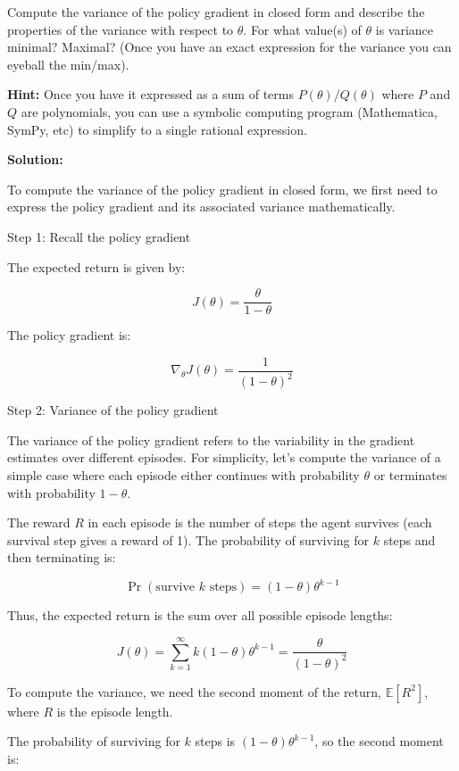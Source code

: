 \documentclass{article}
\begin{document}
\begin{enumerate}
\begin{enumerate}
\end{enumerate}
\newpage
{} Compute the variance of the policy gradient in closed form and describe the properties of the variance with respect to $\theta$. For what value(s) of $\theta$ is variance minimal? Maximal? (Once you have an exact expression for the variance you can eyeball the min/max).

\textbf{Hint:}  Once you have it expressed as a sum of terms $P(\theta)/Q(\theta)$ where $P$ and $Q$ are polynomials, you can use a symbolic computing program (Mathematica, SymPy, etc) to simplify to a single rational expression.

\textbf{Solution:}

To compute the variance of the policy gradient in closed form, we first need to express the policy gradient and its associated variance mathematically.

Step 1: Recall the policy gradient

The expected return is given by:

\[
J(\theta) = \frac{\theta}{1 - \theta}
\]

The policy gradient is:

\[
\nabla_\theta J(\theta) = \frac{1}{(1 - \theta)^2}
\]

Step 2: Variance of the policy gradient

The variance of the policy gradient refers to the variability in the gradient estimates over different episodes. For simplicity, let’s compute the variance of a simple case where each episode either continues with probability \( \theta \) or terminates with probability \( 1 - \theta \).

The reward \( R \) in each episode is the number of steps the agent survives (each survival step gives a reward of 1). The probability of surviving for \( k \) steps and then terminating is:

\[
\Pr(\text{survive } k \text{ steps}) = (1 - \theta)\theta^{k-1}
\]

Thus, the expected return is the sum over all possible episode lengths:

\[
J(\theta) = \sum_{k=1}^{\infty} k (1 - \theta) \theta^{k-1} = \frac{\theta}{(1 - \theta)^2}
\]

To compute the variance, we need the second moment of the return, \( \mathbb{E}[R^2] \), where \( R \) is the episode length.

The probability of surviving for \( k \) steps is \( (1 - \theta) \theta^{k-1} \), so the second moment is:


\end{enumerate}
\end{document}
